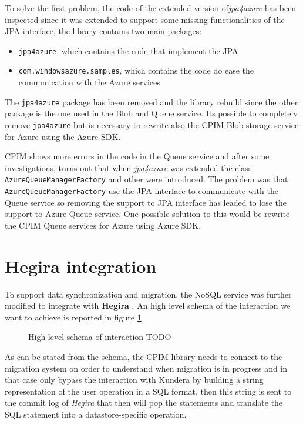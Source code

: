 \noindent To solve the first problem, the code of the extended version of\textit{jpa4azure} has been inspected since it was extended to support some missing functionalities of the JPA interface, the library contains two main packages:
\begin{itemize}
\item \texttt{jpa4azure}, which contains the code that implement the JPA
\item \texttt{com.windowsazure.samples}, which contains the code do ease the communication with the Azure services
\end{itemize}
The \texttt{jpa4azure} package has been removed and the library rebuild since the other package is the one used in the Blob and Queue service. Its possible to completely remove \texttt{jpa4azure} but is necessary to rewrite also the CPIM Blob storage service for Azure using the Azure SDK.

\newparagraph CPIM shows more errors in the code in the Queue service and after some investigations, turns out that when \textit{jpa4azure} was extended the class \texttt{AzureQueueManagerFactory} and other were introduced.
The problem was that \texttt{AzureQueueManagerFactory} use the JPA interface to communicate with the Queue service so removing the support to JPA interface has leaded to lose the support to Azure Queue service.
One possible solution to this would be rewrite the CPIM Queue services for Azure using Azure SDK.

\section{Hegira integration}
\label{sec:hegira}
To support data synchronization and migration, the NoSQL service was further modified to integrate with \textbf{Hegira} \cite{thesis:marco}. An high level schema of the interaction we want to achieve is reported in figure \ref{fig:high-level-interaction}

\begin{figure}[tbh]
  \centering
  \begin{minipage}[c][0.33\textheight][c]{0.5\textwidth}
  \end{minipage}
  \caption{High level schema of interaction TODO}
  \label{fig:high-level-interaction}
\end{figure} 

\noindent As can be stated from the schema, the CPIM library needs to connect to the migration system on order to understand when migration is in progress and in that case only bypass the interaction with Kundera by building a string representation of the user operation in a SQL format, then this string is sent to the commit log of \textit{Hegira} that then will pop the statements and translate the SQL statement into a datastore-specific operation.

